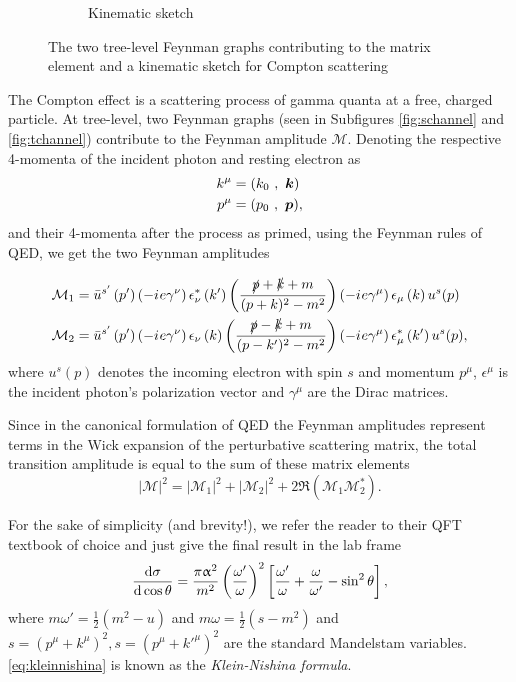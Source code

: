 \begin{figure}
\begin{subfigure}{0.45\textwidth}
		\caption{Kinematic sketch}
		\label{fig:kinematics}
	\end{subfigure}
	\caption{The two tree-level Feynman graphs contributing to the matrix element and a kinematic sketch for Compton scattering}
\end{figure}

The Compton effect is a scattering process of gamma quanta at a free, charged particle. At tree-level, two Feynman graphs (seen in Subfigures \ref{fig:schannel} and \ref{fig:tchannel}) contribute to the Feynman amplitude $\mathcal{M}$.
Denoting the respective 4-momenta of the incident photon and resting electron as
\begin{align*}
	k^\mu &= (k_0\ ,\ \boldsymbol{k}) \\
	p^\mu &= (p_0\ ,\ \boldsymbol{p}),
\end{align*}
and their 4-momenta after the process as primed, using the Feynman rules of QED, we get the two Feynman amplitudes

\begin{align*}
	\mathcal{M}_1 &= \bar{u}^{s'}\left(p'\right)\left(-{i\mkern1mu} e\gamma^\nu\right)\epsilon^{*}_\nu\left(k'\right)\left(\frac{\slashed{p}+\slashed{k}+m}{(p+k)^2-m^2}\right)\left(-{i\mkern1mu} e\gamma^\mu\right)\epsilon_\mu\left(k\right)u^s(p)\\
	\mathcal{M}_2 &= \bar{u}^{s'}\left(p'\right)\left(-{i\mkern1mu} e\gamma^\nu\right)\epsilon_\nu\left(k\right)\left(\frac{\slashed{p}-\slashed{k}+m}{(p-k')^2-m^2}\right)\left(-{i\mkern1mu} e\gamma^\mu\right)\epsilon^{*}_\mu\left(k'\right)u^s(p),
\end{align*}
where $u^s(p)$ denotes the incoming electron with spin $s$ and momentum $p^\mu$, $\epsilon^\mu$ is the incident photon's polarization vector and $\gamma^\mu$ are the Dirac matrices.

Since in the canonical formulation of QED the Feynman amplitudes represent terms in the Wick expansion of the perturbative scattering matrix, the total transition amplitude is equal to the sum of these matrix elements
\begin{equation*}
	|\mathcal{M}|^2 = |\mathcal{M}_1|^2 + |\mathcal{M}_2|^2 + 2\Re\left(\mathcal{M}_1\mathcal{M}_2^*\right).
\end{equation*}

For the sake of simplicity (and brevity!), we refer the reader to their QFT textbook of choice and just give the final result in the lab frame
\begin{equation}\label{eq:kleinnishina}
	\frac{\text{d}\sigma}{\text{d}\cos\theta} = \frac{\pi\upalpha^2}{m^2}\left(\frac{\omega'}{\omega}\right)^2\left[\frac{\omega'}{\omega} + \frac{\omega}{\omega'} - \sin^2\theta\right],
\end{equation}
where $m\omega' = \frac{1}{2}\left(m^2-u\right)$ and $m\omega = \frac{1}{2}\left(s-m^2\right)$ and $s=\left(p^\mu + k^\mu\right)^2, s=\left(p^\mu + k'^\mu\right)^2$ are the standard Mandelstam variables.
\autoref{eq:kleinnishina} is known as the \textit{Klein-Nishina formula}.

